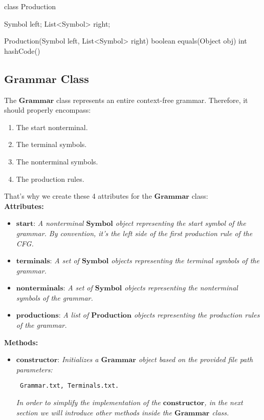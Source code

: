 \begin{codeblock}
    class Production {
        Symbol left;
        List<Symbol> right;

        Production(Symbol left, List<Symbol> right) {}
        boolean equals(Object obj) {}
        int hashCode() {}
    }
\end{codeblock}

\vspace{10pt}

\subsection{\(\boldsymbol{Grammar}\) Class}

The \(\boldsymbol{Grammar}\) class represents an entire context-free grammar. Therefore, it should properly encompass:

\begin{enumerate}
    \item The start nonterminal.
    \item The terminal symbols.
    \item The nonterminal symbols.
    \item The production rules.
\end{enumerate}

That’s why we create these 4 attributes for the \(\boldsymbol{Grammar}\) class:\\

\textbf{Attributes:}
\begin{itemize}
    \item \(\boldsymbol{start}\): \textit{A nonterminal \(\boldsymbol{Symbol}\) object representing the start symbol of the grammar. By convention, it’s the left side of the first production rule of the CFG.}
    \item \(\boldsymbol{terminals}\): \textit{A set of \(\boldsymbol{Symbol}\) objects representing the terminal symbols of the grammar.}
    \item \(\boldsymbol{nonterminals}\): \textit{A set of \(\boldsymbol{Symbol}\) objects representing the nonterminal symbols of the grammar.}
    \item \(\boldsymbol{productions}\): \textit{A list of \(\boldsymbol{Production}\) objects representing the production rules of the grammar.}
\end{itemize}

\textbf{Methods:}
\begin{itemize}
    \item \(\boldsymbol{constructor}\): \textit{Initializes a \(\boldsymbol{Grammar}\) object based on the provided file path parameters:}
    \begin{verbatim} Grammar.txt, Terminals.txt.\end{verbatim}
    \textit{In order to simplify the implementation of the \(\boldsymbol{constructor}\), in the next section we will introduce other methods inside the \(\boldsymbol{Grammar}\) class.}
\end{itemize}

